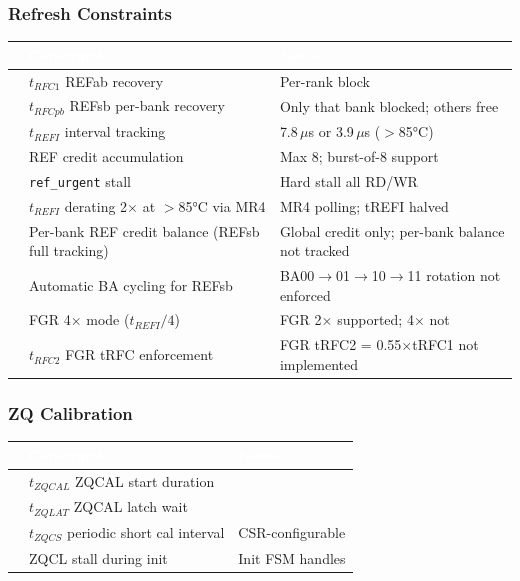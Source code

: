 \documentclass[11pt,a4paper]{article}
\newcommand{\THead}[1]{\cellcolor{navy}\textcolor{white}{\small\textbf{#1}}}
\newcommand{\RA}{\rowcolor{lgray}}
\newcommand{\RB}{\rowcolor{sky!30}}
\newcommand{\cmark}{\textcolor{grn}{\ding{51}}}
\newcommand{\xmark}{\textcolor{red}{\ding{55}}}
\begin{document}
\subsubsection*{Refresh Constraints}
\begin{center}
\begin{tabularx}{\linewidth}{@{} c l X @{}}
\toprule
\THead{} & \THead{Constraint} & \THead{Notes} \\
\midrule
\RA\cmark & $t_{RFC1}$ REFab recovery & Per-rank block \\
\RB\cmark & $t_{RFCpb}$ REFsb per-bank recovery &
  Only that bank blocked; others free \\
\RA\cmark & $t_{REFI}$ interval tracking &
  7.8\,$\mu$s or 3.9\,$\mu$s ($>$85°C) \\
\RB\cmark & REF credit accumulation &
  Max 8; burst-of-8 support \\
\RA\cmark & \texttt{ref\_urgent} stall &
  Hard stall all RD/WR \\
\RB\cmark & $t_{REFI}$ derating 2$\times$ at $>$85°C via MR4 &
  MR4 polling; tREFI halved \\
\RA\xmark & Per-bank REF credit balance (REFsb full tracking) &
  Global credit only; per-bank balance not tracked \\
\RB\xmark & Automatic BA cycling for REFsb &
  BA00$\to$01$\to$10$\to$11 rotation not enforced \\
\RA\xmark & FGR 4$\times$ mode ($t_{REFI}/4$) &
  FGR 2$\times$ supported; 4$\times$ not \\
\RB\xmark & $t_{RFC2}$ FGR tRFC enforcement &
  FGR tRFC2 = 0.55$\times$tRFC1 not implemented \\
\bottomrule
\end{tabularx}
\end{center}

\subsubsection*{ZQ Calibration}
\begin{center}
\begin{tabularx}{\linewidth}{@{} c l X @{}}
\toprule
\THead{} & \THead{Constraint} & \THead{Notes} \\
\midrule
\RA\cmark & $t_{ZQCAL}$ ZQCAL start duration & \\
\RB\cmark & $t_{ZQLAT}$ ZQCAL latch wait & \\
\RA\cmark & $t_{ZQCS}$ periodic short cal interval & CSR-configurable \\
\RB\cmark & ZQCL stall during init & Init FSM handles \\
\bottomrule
\end{tabularx}
\end{center}
\end{document}
